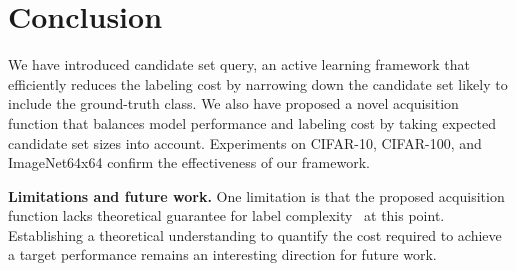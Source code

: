 \section{Conclusion}
We have introduced candidate set query, an active learning framework that efficiently reduces the labeling cost by narrowing down the candidate set likely to include the ground-truth class.
We also have proposed a novel acquisition function that balances model performance and labeling cost by taking expected candidate set sizes into account.
Experiments on CIFAR-10, CIFAR-100, and ImageNet64x64 confirm the effectiveness of our framework.

\noindent\textbf{Limitations and future work.}
One limitation is that the proposed acquisition function lacks theoretical guarantee for label complexity~\citep{dasgupta2011two, hanneke2014theory} at this point.
Establishing a theoretical understanding to quantify the cost required to achieve a target performance remains an interesting direction for future work.
\pagebreak
